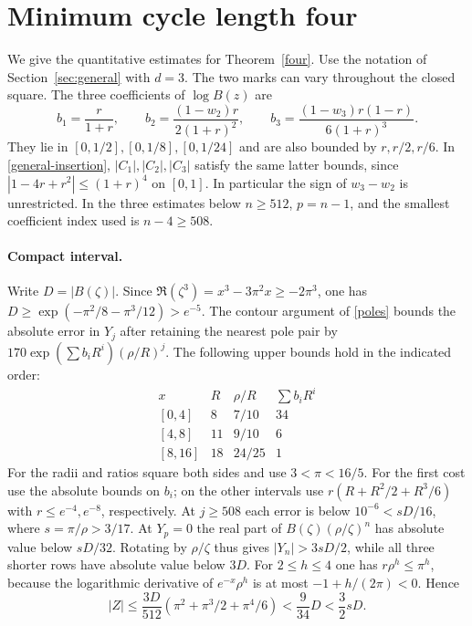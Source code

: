 \section{Minimum cycle length four}\label{sec:four}
We give the quantitative estimates for Theorem~\ref{four}. Use the notation of Section~\ref{sec:general} with \(d=3\). The two marks can vary throughout the closed square. The three coefficients of \(\log B(z)\) are
\[
 b_1=\frac r{1+r},\qquad
 b_2=\frac{(1-w_2)r}{2(1+r)^2},\qquad
 b_3=\frac{(1-w_3)r(1-r)}{6(1+r)^3}.
\]
They lie in \([0,1/2],[0,1/8],[0,1/24]\) and are also bounded by \(r,r/2,r/6\). In \eqref{general-insertion}, \(|C_1|,|C_2|,|C_3|\) satisfy the same latter bounds, since \(|1-4r+r^2|\le(1+r)^4\) on \([0,1]\). In particular the sign of \(w_3-w_2\) is unrestricted. In the three estimates below \(n\ge512\), \(p=n-1\), and the smallest coefficient index used is \(n-4\ge508\).

\paragraph{Compact interval.}
Write \(D=|B(\zeta)|\). Since \(\Re(\zeta^3)=x^3-3\pi^2x\ge-2\pi^3\), one has \(D\ge\exp(-\pi^2/8-\pi^3/12)>e^{-5}\).
The contour argument of \eqref{poles} bounds the absolute error in \(Y_j\) after retaining the nearest pole pair by \(170\exp(\sum b_i R^i)(\rho/R)^j\). The following upper bounds hold in the indicated order:
\[
\begin{array}{c|ccc}
x & R & \rho/R & \sum b_iR^i\\ \hline
{[0,4]}&8&7/10&34\\
{[4,8]}&11&9/10&6\\
{[8,16]}&18&24/25&1
\end{array}
\]
For the radii and ratios square both sides and use \(3<\pi<16/5\). For the first cost use the absolute bounds on \(b_i\); on the other intervals use \(r(R+R^2/2+R^3/6)\) with \(r\le e^{-4},e^{-8}\), respectively. At \(j\ge508\) each error is below \(10^{-6}<sD/16\), where \(s=\pi/\rho>3/17\). At \(Y_p=0\) the real part of \(B(\zeta)(\rho/\zeta)^n\) has absolute value below \(sD/32\). Rotating by \(\rho/\zeta\) thus gives \(|Y_n|>3sD/2\), while all three shorter rows have absolute value below \(3D\). For \(2\le h\le4\) one has \(r\rho^h\le\pi^h\), because the logarithmic derivative of \(e^{-x}\rho^h\) is at most \(-1+h/(2\pi)<0\). Hence
\[
 |Z|\le\frac{3D}{512}(\pi^2+\pi^3/2+\pi^4/6)
 < \frac9{34}D < \frac32sD .
\]

